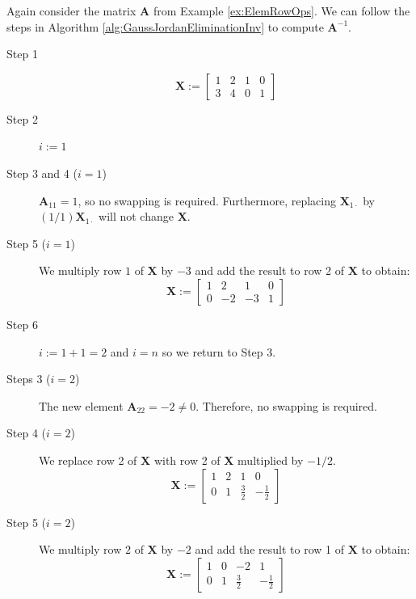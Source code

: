 \begin{example}
Again consider the matrix $\mathbf{A}$ from Example \ref{ex:ElemRowOps}. We can follow the steps in Algorithm \ref{alg:GaussJordanEliminationInv} to compute $\mathbf{A}^{-1}$. 
\begin{description}
\item[Step 1]
\begin{displaymath}
\mathbf{X} := \left[\begin{array}{cc|cc}
1 & 2 & 1 & 0\\
3 & 4 & 0 & 1
\end{array}\right]
\end{displaymath}

\item[Step 2] $i:=1$

\item[Step 3 and 4 ($i=1$)]
$\mathbf{A}_{11} = 1$, so no swapping is required. Furthermore, replacing 
$\mathbf{X}_{1\cdot}$ by $(1/1)\mathbf{X}_{1\cdot}$ will not change $\mathbf{X}$. 

\item[Step 5 ($i=1$)] We multiply row $1$ of $\mathbf{X}$ by $-3$ and add the result to row 2 of $\mathbf{X}$ to obtain:
\begin{displaymath}
\mathbf{X} := \left[\begin{array}{cc|cc}
1 & 2 & 1 & 0\\
0 & -2 & -3 & 1
\end{array}\right]
\end{displaymath}

\item[Step 6] $i:=1+1=2$ and $i = n$ so we return to Step 3.

\item[Steps 3 ($i=2$)] The new element $\mathbf{A}_{22} = -2 \neq 0$. Therefore, no swapping is required.

\item[Step 4 ($i=2$)]
We replace row 2 of $\mathbf{X}$ with row 2 of $\mathbf{X}$ multiplied by $-1/2$.
\begin{displaymath}
\mathbf{X} := \left[\begin{array}{cc|cc}
1 & 2 & 1 & 0\\
0 & 1 & \frac{3}{2} & -\frac{1}{2}
\end{array}\right]
\end{displaymath}

\item[Step 5 ($i=2$)] We multiply row $2$ of $\mathbf{X}$ by $-2$ and add the result to row 1 of $\mathbf{X}$ to obtain:
\begin{displaymath}
\mathbf{X} := \left[\begin{array}{cc|cc}
1 & 0 & -2 & 1\\
0 & 1 & \frac{3}{2} & -\frac{1}{2}
\end{array}\right]
\end{displaymath}


\end{description}
\end{example}

